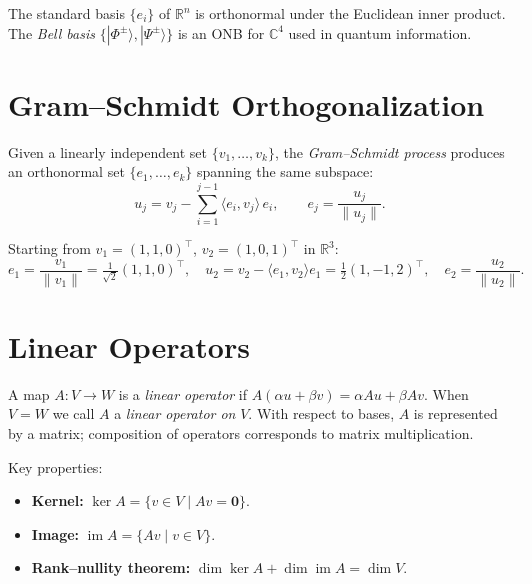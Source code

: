 \begin{example}
The standard basis $\{e_i\}$ of $\mathbb{R}^n$ is orthonormal under the Euclidean inner product. The \emph{Bell basis} $\{|\Phi^\pm\rangle,|\Psi^\pm\rangle\}$ is an ONB for $\mathbb{C}^4$ used in quantum information.
\end{example}

\section{Gram--Schmidt Orthogonalization}

Given a linearly independent set $\{v_1,\ldots,v_k\}$, the \emph{Gram--Schmidt process} produces an orthonormal set $\{e_1,\ldots,e_k\}$ spanning the same subspace:
\[
  u_j = v_j - \sum_{i=1}^{j-1}\langle e_i, v_j\rangle\, e_i, \qquad e_j = \frac{u_j}{\|u_j\|}.
\]

\begin{example}
Starting from $v_1=(1,1,0)^\top$, $v_2=(1,0,1)^\top$ in $\mathbb{R}^3$:
\[
  e_1 = \frac{v_1}{\|v_1\|} = \tfrac{1}{\sqrt{2}}(1,1,0)^\top,\quad
  u_2 = v_2 - \langle e_1,v_2\rangle e_1 = \tfrac{1}{2}(1,-1,2)^\top,\quad
  e_2 = \frac{u_2}{\|u_2\|}.
\]
\end{example}

\section{Linear Operators}

A map $A: V\to W$ is a \emph{linear operator} if $A(\alpha u+\beta v)=\alpha Au+\beta Av$. When $V=W$ we call $A$ a \emph{linear operator on} $V$. With respect to bases, $A$ is represented by a matrix; composition of operators corresponds to matrix multiplication.

Key properties:
\begin{itemize}
  \item \textbf{Kernel:} $\ker A = \{v\in V \mid Av=\mathbf{0}\}$.
  \item \textbf{Image:} $\operatorname{im} A = \{Av \mid v\in V\}$.
  \item \textbf{Rank--nullity theorem:} $\dim\ker A + \dim\operatorname{im} A = \dim V$.
\end{itemize}

